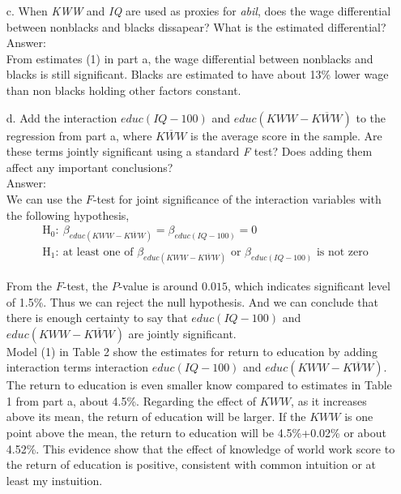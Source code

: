 \documentclass[10pt]{article}
\begin{document}
\begin{enumerate}
\item[c.] When \textit{KWW} and \textit{IQ} are used as proxies for \textit{abil}, does the wage differential between nonblacks and blacks dissapear? What is the estimated differential?
\\ Answer:\\
From estimates (1) in part a, the wage differential between nonblacks and blacks is still significant. Blacks are estimated to have about 13\% lower wage than non blacks holding other factors constant.

\item[d.] Add the interaction $educ(IQ-100)$ and $educ(KWW-\overline{KWW})$ to the regression from part a, where $\overline{KWW}$ is the average score in the sample. Are these terms jointly significant using a standard \textit{F} test? Does adding them affect any important conclusions?
\\ Answer:\\
We can use the $F$-test for joint significance of the interaction variables with the following hypothesis,
\begin{align*}
    &\text{H}_0:\ \beta_{educ(KWW-\overline{KWW})}=\beta_{educ(IQ-100)}=0\\
    &\text{H}_1:\ \text{at least one of }\beta_{educ(KWW-\overline{KWW})}\text{ or }\beta_{educ(IQ-100)} \text{ is not zero}
\end{align*}

From the $F$-test, the $P$-value is around $0.015$, which indicates significant level of 1.5\%. Thus we can reject the null hypothesis. And we can conclude that there is enough certainty to say that $educ(IQ-100)$ and $educ(KWW-\overline{KWW})$ are jointly significant.\\
Model (1) in Table 2 show the estimates for return to education by adding interaction terms interaction $educ(IQ-100)$ and $educ(KWW-\overline{KWW})$. The return to education is even smaller know compared to estimates in Table 1 from part a, about 4.5\%. Regarding the effect of $KWW$, as it increases above its mean, the return of education will be larger. If the $KWW$ is one point above the mean, the return to education will be 4.5\%+0.02\% or about 4.52\%. This evidence show that the effect of knowledge of world work score to the return of education is positive, consistent with common intuition or at least my instuition.

\end{enumerate}
\end{document}
